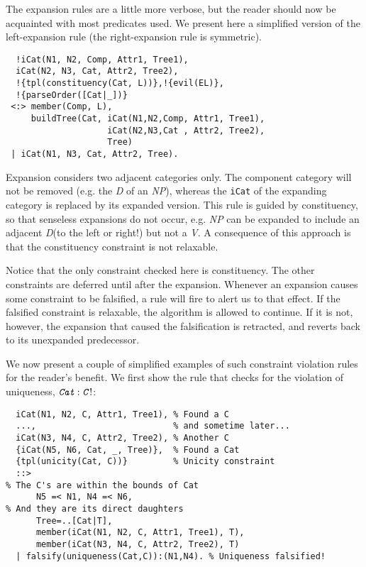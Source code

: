 \documentclass{llncs}
\newcommand{\uniqueness}[2]{\textit{#1} : \textit{#2}\,!}
\newcommand{\NP}{\textit{NP}\xspace}
\newcommand{\V}{\textit{V}\xspace}
\newcommand{\D}{\textit{D}\xspace}
\begin{document}
The expansion rules are a little more verbose, but the reader should now be acquainted with most predicates used. We present here a simplified version of the left-expansion rule (the right-expansion rule is symmetric).

\begin{verbatim}
  !iCat(N1, N2, Comp, Attr1, Tree1), 
  iCat(N2, N3, Cat, Attr2, Tree2),
  !{tpl(constituency(Cat, L))},!{evil(EL)},
  !{parseOrder([Cat|_])}
 <:> member(Comp, L),
     buildTree(Cat, iCat(N1,N2,Comp, Attr1, Tree1),
                    iCat(N2,N3,Cat , Attr2, Tree2),
                    Tree)
 | iCat(N1, N3, Cat, Attr2, Tree).
\end{verbatim}

Expansion considers two adjacent categories only. The component category will not be removed (e.g. the \D of an \NP), whereas the \texttt{iCat} of the expanding category is replaced by its expanded version. This rule is guided by constituency, so that senseless expansions do not occur, e.g. \NP can be expanded to include an adjacent \D (to the left or right!) but not a \V. A consequence of this approach is that the constituency constraint is not relaxable.

Notice that the only constraint checked here is constituency. The other constraints are deferred until after the expansion. Whenever an expansion causes some constraint to be falsified, a rule will fire to alert us to that effect. If the falsified constraint is relaxable, the algorithm is allowed to continue. If it is not, however, the expansion that caused the falsification is retracted, and reverts back to its unexpanded predecessor.

We now present a couple of simplified examples of such constraint violation rules for the reader's benefit. We first show the rule that checks for the violation of uniqueness, $\uniqueness{\texttt{Cat}}{\texttt{C}}$:

\begin{verbatim}
  iCat(N1, N2, C, Attr1, Tree1), % Found a C
  ...,                           % and sometime later...
  iCat(N3, N4, C, Attr2, Tree2), % Another C
  {iCat(N5, N6, Cat, _, Tree)},  % Found a Cat
  {tpl(unicity(Cat, C))}         % Unicity constraint
  ::>
% The C's are within the bounds of Cat
      N5 =< N1, N4 =< N6,
% And they are its direct daughters
      Tree=..[Cat|T],
      member(iCat(N1, N2, C, Attr1, Tree1), T),
      member(iCat(N3, N4, C, Attr2, Tree2), T)
  | falsify(uniqueness(Cat,C)):(N1,N4). % Uniqueness falsified!
\end{verbatim}
\end{document}
